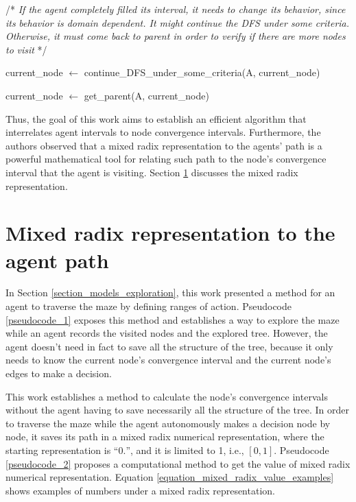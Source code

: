 \begin{algorithm}
\begin{algorithmic}
\EndIf

\State

\State /* \textit{If the agent completely filled its interval, it needs to change its behavior, since its}
\State \textit{behavior is domain dependent. It might continue the DFS under some criteria.}
\State \textit{Otherwise, it must come back to parent in order to verify if there are more nodes to}
\State \textit{visit} */


\State current\_node $\gets$ continue\_DFS\_under\_some\_criteria(A, current\_node)

\Else

\State current\_node $\gets$ get\_parent(A, current\_node)

\EndIf

\EndWhile

\end{algorithmic}
\end{algorithm}

Thus, the goal of this work aims to establish an efficient algorithm that interrelates agent intervals to node convergence intervals. Furthermore, the authors observed that a mixed radix representation to the agents' path is a powerful mathematical tool for relating such path to the node's convergence interval that the agent is visiting. Section \ref{section_models_mixed_radix} discusses the mixed radix representation.

\section{Mixed radix representation to the agent path}
\label{section_models_mixed_radix}
In Section \ref{section_models_exploration}, this work presented a method for an agent to traverse the maze by defining ranges of action. Pseudocode \ref{pseudocode_1} exposes this method and establishes a way to explore the maze while an agent records the visited nodes and the explored tree. However, the agent doesn't need in fact to save all the structure of the tree, because it only needs to know the current node's convergence interval and the current node's edges to make a decision.

This work establishes a method to calculate the node's convergence intervals without the agent having to save necessarily all the structure of the tree. In order to traverse the maze while the agent autonomously makes a decision node by node, it saves its path in a mixed radix numerical representation, where the starting representation is ``$0.$'', and it is limited to 1, i.e., $[0,1]$. Pseudocode \ref{pseudocode_2} proposes a computational method to get the value of mixed radix numerical representation. Equation \ref{equation_mixed_radix_value_examples} shows examples of numbers under a mixed radix representation.

